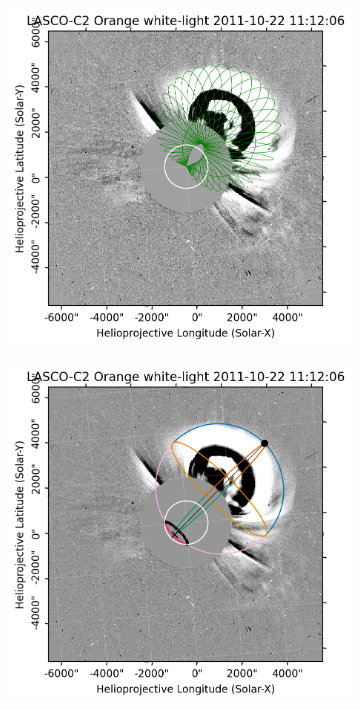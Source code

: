 \begin{figure}[htp]
\begin{subfigure}[b]{0.3\textwidth}
	\end{subfigure}
	\hfill
	\begin{subfigure}[b]{0.3\textwidth}
		\includegraphics[width=\textwidth]{chapter2/figs/Fig_g1.png}
	\end{subfigure}
	\medskip %
	\begin{subfigure}[b]{0.3\textwidth}
		\includegraphics[width=\textwidth]{chapter2/figs/Fig_s2.png}

\end{subfigure}
\end{figure}
